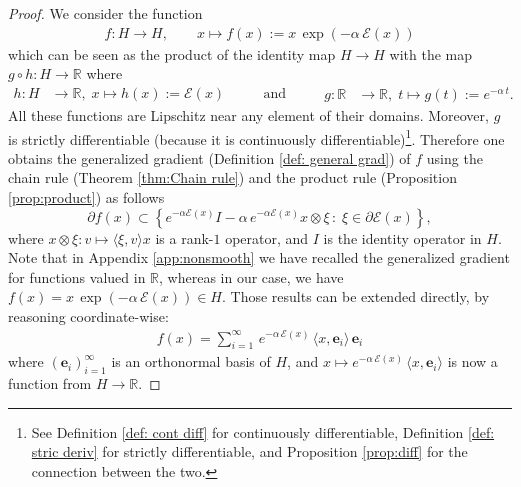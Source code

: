 \documentclass[12pt]{amsart}
\numberwithin{equation}{section}
\begin{document}
\begin{proof}
We consider the function 
\begin{equation*}
\begin{aligned}
    f:H\longrightarrow H, \qquad x\longmapsto f(x) := x\,\exp(-\alpha\, \mathscr{E}(x))
\end{aligned}
\end{equation*}
which can be seen as the product of the identity map $H\to H$ with the map $g\circ h : H\longrightarrow \mathbb{R}$ where 
\begin{equation*}
\begin{aligned}
    h:H & \longrightarrow \mathbb{R},\;
    x  \longmapsto h(x):=\mathscr{E}(x)
\end{aligned}
\qquad \text{ and } \qquad
\begin{aligned}
    g:\mathbb{R} & \longrightarrow \mathbb{R},\;
    t  \longmapsto g(t):=e^{-\alpha \,t}.
\end{aligned}
\end{equation*}
All these functions are Lipschitz near any element of their domains. Moreover, $g$ is strictly differentiable (because it is continuously differentiable)\footnote{See Definition \ref{def: cont diff} for continuously differentiable, Definition \ref{def: stric deriv} for strictly differentiable, and Proposition \ref{prop:diff} for the connection between the two.}. Therefore one obtains the generalized gradient (Definition \ref{def: general grad}) of $f$ using the chain rule (Theorem \ref{thm:Chain rule}) and the product rule (Proposition \ref{prop:product}) as follows
\begin{equation}\label{subdiff f}
    \partial f(x) \subset \left\{ e^{-\alpha \mathscr{E}(x)}I - \alpha\,e^{-\alpha\mathscr{E}(x)}x\otimes \xi\,:\; \xi \in \partial \mathscr{E}(x)\right\},
\end{equation}
where $x\otimes \xi: v\mapsto \langle \xi, v \rangle x$ is a rank-$1$ operator, and $I$ is the identity operator in $H$. 
Note that in Appendix \ref{app:nonsmooth} we have recalled the generalized gradient for functions valued in $\mathbb{R}$, whereas in our case, we have $f(x) = x\,\exp({-\alpha \,\mathscr{E}(x)}) \in H$. Those results can be extended directly, by reasoning coordinate-wise: 
\begin{equation*}
\begin{aligned}
    f(x) = \sum\limits_{i=1}^{\infty} \,e^{-\alpha \,\mathscr{E}(x)} \, \langle x, \mathbf{e}_i \rangle\, \mathbf{e}_i
\end{aligned}
\end{equation*}
where $(\mathbf{e}_i)_{i=1}^{\infty}$ is an orthonormal basis of $H$, and   $x\mapsto e^{-\alpha \,\mathscr{E}(x)} \, \langle x, \mathbf{e}_i \rangle$ is now a function from $H\to \mathbb{R}$.


\end{proof}
\end{document}
